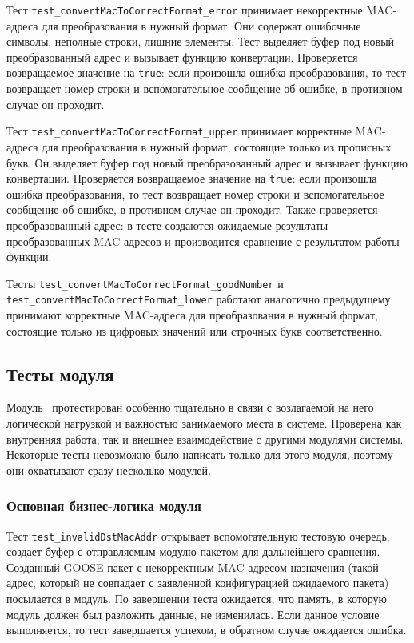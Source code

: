 Тест \lstinline{test_convertMacToCorrectFormat_error} принимает некорректные MAC-адреса для преобразования в нужный формат. Они содержат ошибочные символы, неполные строки, лишние элементы. Тест выделяет буфер под новый преобразованный адрес и вызывает функцию конвертации. Проверяется возвращаемое значение на \lstinline{true}: если произошла ошибка преобразования, то тест возвращает номер строки и вспомогательное сообщение об ошибке, в противном случае он проходит.

Тест \lstinline{test_convertMacToCorrectFormat_upper} принимает корректные MAC-адреса для преобразования в нужный формат, состоящие только из прописных букв. Он выделяет буфер под новый преобразованный адрес и вызывает функцию конвертации. Проверяется возвращаемое значение на \lstinline{true}: если произошла ошибка преобразования, то тест возвращает номер строки и вспомогательное сообщение об ошибке, в противном случае он проходит. Также проверяется преобразованный адрес: в тесте создаются ожидаемые результаты преобразованных MAC-адресов и производится сравнение с результатом работы функции.

Тесты \lstinline{test_convertMacToCorrectFormat_goodNumber} и \lstinline{test_convertMacToCorrectFormat_lower} работают аналогично предыдущему: принимают корректные MAC-адреса для преобразования в нужный формат, состоящие только из  цифровых значений или  строчных букв соответственно.

\subsection{Тесты модуля \moduleRecvPackets}

Модуль \moduleRecvPackets\ протестирован особенно тщательно в связи с возлагаемой на него логической нагрузкой и важностью занимаемого места в системе. Проверена как внутренняя работа, так и внешнее взаимодействие с другими модулями системы. Некоторые тесты невозможно было написать только для этого модуля, поэтому они охватывают сразу несколько модулей.

\subsubsection{Основная бизнес-логика модуля}

Тест \lstinline{test_invalidDstMacAddr} открывает вспомогательную тестовую очередь, создает буфер с отправляемым модулю пакетом для дальнейшего сравнения.
Созданный GOOSE-пакет с некорректным  MAC-адресом назначения (такой адрес, который не совпадает с заявленной конфигурацией ожидаемого пакета) посылается в модуль. По завершении теста ожидается, что память, в которую модуль должен был разложить данные, не изменилась. Если данное условие выполняется, то тест завершается успехом, в обратном случае ожидается ошибка.

